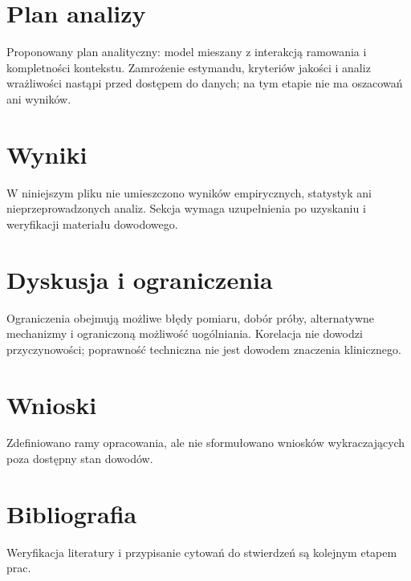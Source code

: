 \documentclass[11pt,a4paper]{article}
\begin{document}
\section{Plan analizy}

Proponowany plan analityczny: model mieszany z interakcją ramowania i kompletności kontekstu. Zamrożenie estymandu, kryteriów jakości i analiz wrażliwości nastąpi przed dostępem do danych; na tym etapie nie ma oszacowań ani wyników.

\section{Wyniki}

W niniejszym pliku nie umieszczono wyników empirycznych, statystyk ani nieprzeprowadzonych analiz. Sekcja wymaga uzupełnienia po uzyskaniu i weryfikacji materiału dowodowego.

\section{Dyskusja i ograniczenia}

Ograniczenia obejmują możliwe błędy pomiaru, dobór próby, alternatywne mechanizmy i ograniczoną możliwość uogólniania. Korelacja nie dowodzi przyczynowości; poprawność techniczna nie jest dowodem znaczenia klinicznego.

\section{Wnioski}

Zdefiniowano ramy opracowania, ale nie sformułowano wniosków wykraczających poza dostępny stan dowodów.

\section*{Bibliografia}

Weryfikacja literatury i przypisanie cytowań do stwierdzeń są kolejnym etapem prac.
\end{document}
